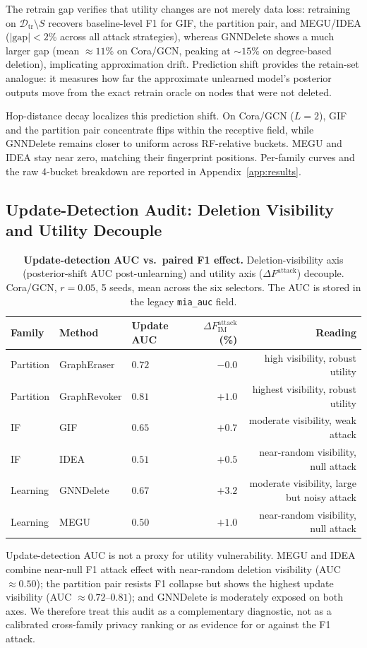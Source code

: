 The retrain gap verifies that utility changes are not merely data loss:
retraining on $\mathcal{D}_{\mathrm{tr}}\setminus S$ recovers
baseline-level F1 for GIF, the partition pair, and MEGU/IDEA
($|\mathrm{gap}|<2\%$ across all attack strategies), whereas
GNNDelete shows a much larger gap (mean ${\approx}11\%$ on Cora/GCN,
peaking at ${\sim}15\%$ on degree-based deletion), implicating
approximation drift. Prediction shift provides the retain-set analogue:
it measures how far the approximate unlearned model's posterior outputs
move from the exact retrain oracle on nodes that were not deleted.

Hop-distance decay localizes this prediction shift. On Cora/GCN ($L=2$), GIF and
the partition pair concentrate flips within the receptive field, while
GNNDelete remains closer to uniform across RF-relative buckets. MEGU and
IDEA stay near zero, matching their fingerprint positions. Per-family
curves and the raw 4-bucket breakdown are reported in
Appendix~\ref{app:results}.

\subsection{Update-Detection Audit: Deletion Visibility and Utility Decouple}
\label{sec:results-mia}

\begin{table}[t]
\centering
\small
\caption{\textbf{Update-detection AUC vs.\ paired F1 effect.}
Deletion-visibility axis (posterior-shift AUC post-unlearning) and
utility axis ($\Delta F^{\text{attack}}$) decouple. Cora/GCN,
$r{=}0.05$, 5 seeds, mean across the six selectors. The AUC is
stored in the legacy \texttt{mia\_auc} field.}
\label{tab:mia}
\begin{tabular}{@{}lllrr@{}}
\toprule
Family & Method & Update AUC & $\Delta F^{\text{attack}}_{\mathrm{IM}}$ (\%) & Reading \\
\midrule
Partition & GraphEraser  & $0.72$ & $-0.0$     & high visibility, robust utility \\
Partition & GraphRevoker & $0.81$ & $+1.0$     & highest visibility, robust utility \\
IF        & GIF          & $0.65$ & $+0.7$     & moderate visibility, weak attack \\
IF        & IDEA         & $0.51$ & $+0.5$     & near-random visibility, null attack \\
Learning  & GNNDelete    & $0.67$ & $+3.2$     & moderate visibility, large but noisy attack \\
Learning  & MEGU         & $0.50$ & $+1.0$     & near-random visibility, null attack \\
\bottomrule
\end{tabular}
\end{table}

Update-detection AUC is not a proxy for utility vulnerability. MEGU
and IDEA combine near-null F1 attack effect with near-random deletion
visibility (AUC ${\approx}0.50$); the partition pair resists F1
collapse but shows the highest update visibility
(AUC $\approx 0.72$--$0.81$); and GNNDelete is moderately
exposed on both axes. We therefore treat this audit as a
complementary diagnostic, not as a calibrated cross-family privacy
ranking or as evidence for or against the F1 attack.
